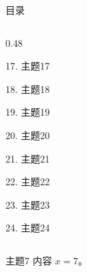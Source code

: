 \documentclass[aspectratio=169,10pt,fontset=fandol]{ctexbeamer}
\begin{document}
\begin{frame}[t,fragile]{目录}
\begin{columns}[T,onlytextwidth]
\begin{column}{0.48\textwidth}
{\color{gray!40}\small 17. 主题17\par}\vspace{0.22em}
{\color{gray!40}\small 18. 主题18\par}\vspace{0.22em}
{\color{gray!40}\small 19. 主题19\par}\vspace{0.22em}
{\color{gray!40}\small 20. 主题20\par}\vspace{0.22em}
{\color{gray!40}\small 21. 主题21\par}\vspace{0.22em}
{\color{gray!40}\small 22. 主题22\par}\vspace{0.22em}
{\color{gray!40}\small 23. 主题23\par}\vspace{0.22em}
{\color{gray!40}\small 24. 主题24\par}\vspace{0.22em}
\end{column}
\end{columns}
\end{frame}
\begin{frame}[t,fragile]{主题7}
\normalsize
{\normalsize
内容 $x=7$。
}
\end{frame}
\end{document}
